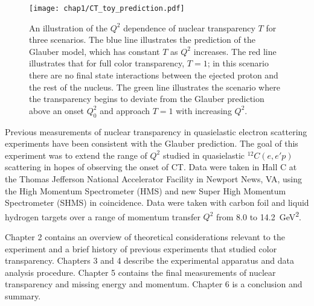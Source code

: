 \begin{figure}[!h]
    \centering
    \texttt{[image: chap1/CT\_toy\_prediction.pdf]}
    \caption[ An illustration of the $Q^2$ dependence of nuclear transparency $T$
            for three scenarios.]{
            An illustration of the $Q^2$ dependence of nuclear transparency $T$
            for three scenarios.
            The blue line illustrates the prediction of the Glauber model,
            which has constant $T$ as $Q^2$ increases.
            The red line illustrates that for full color transparency, $T=1$;
            in this scenario there are no final state interactions between the
            ejected proton and the rest of the nucleus.
            The green line illustrates the scenario where the transparency
            begins to deviate from the Glauber prediction above an onset
            $Q_0^2$ and approach $T=1$ with increasing $Q^2$.
            }
    \label{fig:CT_toy_prediction}
\end{figure}

Previous measurements of nuclear transparency in quasielastic electron
scattering experiments have been consistent with the Glauber prediction.
The goal of this experiment was to extend the range of $Q^2$ studied
in quasielastic ${}^{12}C(e,e'p)$ scattering in hopes of observing the onset
of CT.
Data were taken in Hall C at the Thomas Jefferson National Accelerator Facility
in Newport News, VA, using the High Momentum Spectrometer (HMS) and new Super
High Momentum Spectrometer (SHMS) in coincidence.
Data were taken with carbon foil and liquid hydrogen targets over a range of
momentum transfer $Q^2$ from 8.0 to \SI{14.2}{\giga\electronvolt\squared}.


Chapter 2 contains an overview of theoretical considerations relevant to
the experiment and a brief history of previous experiments that studied color
transparency.
Chapters 3 and 4 describe the experimental apparatus and data analysis
procedure.
Chapter 5 contains the final measurements of nuclear transparency and missing
energy and momentum.
Chapter 6 is a conclusion and summary.
